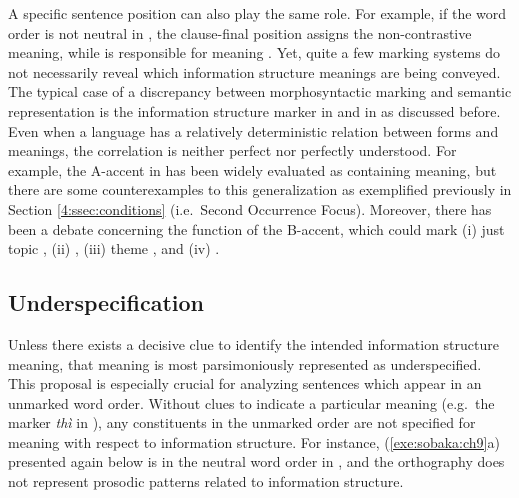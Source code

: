 \noindent A specific sentence position can also play the same
role. For example, if the word order is not neutral in ,
the clause-final position assigns the non-contrastive 
meaning, while  is responsible for
 meaning \citep{neeleman:titov:09}. Yet, quite
a few marking systems do not necessarily reveal which information
structure meanings are being conveyed. The typical case of a
discrepancy between morphosyntactic marking and semantic
representation is the information structure marker \wa in
 and \nun in  as discussed before. Even when
a language has a relatively deterministic relation between forms and
meanings, the correlation is neither perfect nor perfectly
understood. For example, the A-accent in  has been widely
evaluated as containing  meaning, but there are some
counterexamples to this generalization as exemplified previously in
Section \ref{4:ssec:conditions} (i.e.\ Second Occurrence Focus). Moreover,
there has been a debate concerning the function of the B-accent, which
could mark (i) just topic \citep{jackendoff:72}, (ii)  \citep{kadmon:01,buring:03}, (iii) theme \citep{steedman:00},
and (iv)  \citep{hedberg:06}.




\subsection{Underspecification}
\label{9:ssec:underspecification}

Unless there exists a decisive clue to identify the intended
information structure meaning, that meaning is most parsimoniously
represented as underspecified.
This proposal is especially crucial for
analyzing sentences which appear in an unmarked word order.  Without
clues to indicate a particular meaning (e.g.\ the 
marker \textit{th{\`i}} in ), any constituents in the
unmarked order are not specified for meaning with respect to
information structure. For instance, (\ref{exe:sobaka:ch9}a) presented
again below is in the neutral word order in , and the
orthography does not represent prosodic patterns related to
information structure.




